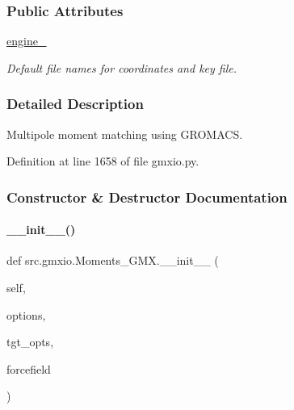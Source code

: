 \subsubsection*{Public Attributes}
\begin{DoxyCompactItemize}
\item 
\hyperlink{classsrc_1_1gmxio_1_1Moments__GMX_a725ad55ef0765b5b2c514558a28cb338}{engine\+\_\+}
\begin{DoxyCompactList}\small\item\em Default file names for coordinates and key file. \end{DoxyCompactList}\end{DoxyCompactItemize}


\subsubsection{Detailed Description}
Multipole moment matching using G\+R\+O\+M\+A\+CS. 



Definition at line 1658 of file gmxio.\+py.



\subsubsection{Constructor \& Destructor Documentation}
\mbox{\label{classsrc_1_1gmxio_1_1Moments__GMX_aa9e32792e45e50f3f860ce98b08f98b8}} 
\paragraph{\texorpdfstring{\+\_\+\+\_\+init\+\_\+\+\_\+()}{\_\_init\_\_()}}
{\footnotesize\ttfamily def src.\+gmxio.\+Moments\+\_\+\+G\+M\+X.\+\_\+\+\_\+init\+\_\+\+\_\+ (\begin{DoxyParamCaption}\item[{}]{self,  }\item[{}]{options,  }\item[{}]{tgt\+\_\+opts,  }\item[{}]{forcefield }\end{DoxyParamCaption})}




